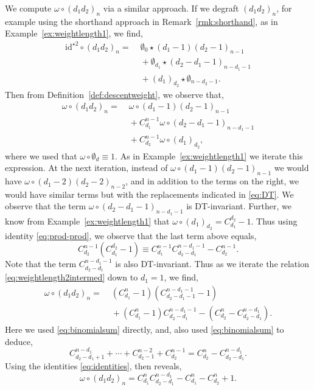 \documentclass[5p,twocolumn]{elsarticle}
\newcommand*{\id}{{\mathrm{id}}}
\begin{document}
%
\begin{example}\label{ex:weightlength2} 
  We compute $\omega\circ (d_1d_2)_n$ via a similar approach.
  If we degraft $(d_1d_2)_n$, for example using the shorthand approach in Remark~\ref{rmk:shorthand}, as in Example~\ref{ex:weightlength1}, we find,
  \begin{align*}
    \id^{\star 2}\circ(d_1d_2)_n=&\;\emptyset_0\star(d_1-1)(d_2-1)_{n-1}\\
                               &\;+\emptyset_{d_1}\star(d_2-d_1-1)_{n-d_1-1}\\
                               &\;+(d_1)_{d_2}\star\emptyset_{n-d_2-1}.
  \end{align*}
  Then from Definition~\ref{def:descentweight}, we observe that,    
  \begin{align}
    \omega\circ(d_1d_2)_n=&\;\omega\circ(d_1-1)(d_2-1)_{n-1}\nonumber\\
                          &\;+C^{n-1}_{d_1}\omega\circ(d_2-d_1-1)_{n-d_1-1}\nonumber\\
                          &\;+C_{d_2}^{n-1}\omega\circ(d_1)_{d_2},\label{eq:weightlength2intermed}
  \end{align}
  where we used that $\omega\circ\emptyset_d\equiv1$. As in Example~\ref{ex:weightlength1} we iterate this expression.
  At the next iteration, instead of $\omega\circ(d_1-1)(d_2-1)_{n-1}$ we would have $\omega\circ(d_1-2)(d_2-2)_{n-2}$,
  and in addition to the terms on the right, we would have similar terms but with the replacements indicated in \eqref{eq:DT}. 
  We observe that the term $\omega\circ(d_2-d_1-1)_{n-d_1-1}$ is DT-invariant.
  Further, we know from Example~\ref{ex:weightlength1} that $\omega\circ(d_1)_{d_2}=C^{d_2}_{d_1}-1$.
  Thus using identity \eqref{eq:prod-prod}, we observe that the last term above equals,
  \begin{equation*}
    C_{d_2}^{n-1}(C^{d_2}_{d_1}-1)\equiv C_{d_1}^{n-1}C^{n-d_1-1}_{d_2-d_1}-C_{d_2}^{n-1}.
  \end{equation*}
  Note that the term $C^{n-d_1-1}_{d_2-d_1}$ is also DT-invariant.
  Thus as we iterate the relation \eqref{eq:weightlength2intermed} down to $d_1=1$, we find,
  \begin{align*}
    \omega\circ(d_1d_2)_n=&\;(C^{n}_{d_1}-1)(C^{n-d_1-1}_{d_2-d_1-1}-1)\\
                          &\;+(C_{d_1}^{n}-1)C^{n-d_1-1}_{d_2-d_1}-(C_{d_2}^{n}-C_{d_2-d_1}^{n-d_1}).
  \end{align*}
  Here we used \eqref{eq:binomialsum} directly, and, also used \eqref{eq:binomialsum} to deduce,
  \begin{equation*}
      C^{n-d_1}_{d_2-d_1+1}+\cdots+C^{n-2}_{d_2-1}+C^{n-1}_{d_2}=C_{d_2}^{n}-C_{d_2-d_1}^{n-d_1}.
  \end{equation*}
  Using the identities \eqref{eq:identities}, then reveals,
  \begin{equation*}
     \omega\circ(d_1d_2)_n=C_{d_1}^{n}C^{n-d_1}_{d_2-d_1}-C^n_{d_1}-C^n_{d_2}+1.
  \end{equation*}
\end{example}
\end{document}
